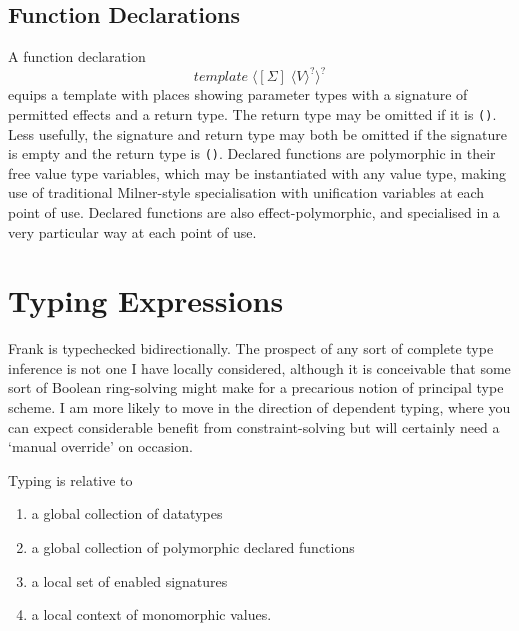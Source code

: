 \documentclass{article}
\begin{document}
\subsection{Function Declarations}

A function declaration
\[
\mathit{template}\;\langle[\Sigma]\;\langle V\rangle^?\rangle^?
\]
equips a template with places showing parameter types with a
signature of permitted effects and a return type. The return type may be omitted if it is \texttt{()}. Less usefully, the signature and return type may both be omitted if the signature is empty and the return type is \texttt{()}.
Declared functions are polymorphic in their free value type variables, which may be instantiated with any value type, making use of traditional Milner-style specialisation with unification variables at each point of use. Declared functions are also effect-polymorphic, and specialised in a very particular way at each point of use.


\section{Typing Expressions}

Frank is typechecked bidirectionally. The prospect of any sort of complete type inference is not one I have locally considered, although it is conceivable that some sort of Boolean ring-solving might make for a precarious notion of principal type scheme. I am more likely to move in the direction of dependent typing, where you can expect considerable benefit from constraint-solving but will certainly need a `manual override' on occasion.

Typing is relative to
\begin{enumerate}
\item a global collection of datatypes
\item a global collection of polymorphic declared functions
\item a local set of enabled signatures
\item a local context of monomorphic values.
\end{enumerate}
\end{document}
